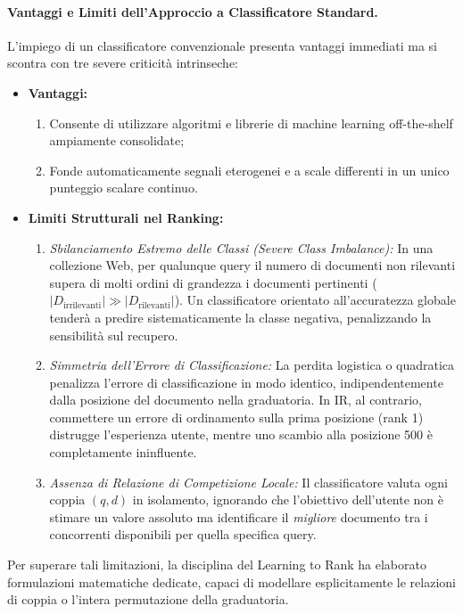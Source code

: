 \paragraph{Vantaggi e Limiti dell'Approccio a Classificatore Standard.}
L'impiego di un classificatore convenzionale presenta vantaggi immediati ma si scontra con tre severe criticit\`a intrinseche:
\begin{itemize}
    \item \textbf{Vantaggi:}
    \begin{enumerate}
        \item Consente di utilizzare algoritmi e librerie di machine learning off-the-shelf ampiamente consolidate;
        \item Fonde automaticamente segnali eterogenei e a scale differenti in un unico punteggio scalare continuo.
    \end{enumerate}
    \item \textbf{Limiti Strutturali nel Ranking:}
    \begin{enumerate}
        \item \textit{Sbilanciamento Estremo delle Classi (\textit{Severe Class Imbalance}):} In una collezione Web, per qualunque query il numero di documenti non rilevanti supera di molti ordini di grandezza i documenti pertinenti ($|D_{\text{irrilevanti}}| \gg |D_{\text{rilevanti}}|$). Un classificatore orientato all'accuratezza globale tender\`a a predire sistematicamente la classe negativa, penalizzando la sensibilit\`a sul recupero.
        \item \textit{Simmetria dell'Errore di Classificazione:} La perdita logistica o quadratica penalizza l'errore di classificazione in modo identico, indipendentemente dalla posizione del documento nella graduatoria. In IR, al contrario, commettere un errore di ordinamento sulla prima posizione (rank 1) distrugge l'esperienza utente, mentre uno scambio alla posizione 500 \`e completamente ininfluente.
        \item \textit{Assenza di Relazione di Competizione Locale:} Il classificatore valuta ogni coppia $(q, d)$ in isolamento, ignorando che l'obiettivo dell'utente non \`e stimare un valore assoluto ma identificare il \textit{migliore} documento tra i concorrenti disponibili per quella specifica query.
    \end{enumerate}
\end{itemize}
Per superare tali limitazioni, la disciplina del Learning to Rank ha elaborato formulazioni matematiche dedicate, capaci di modellare esplicitamente le relazioni di coppia o l'intera permutazione della graduatoria.

